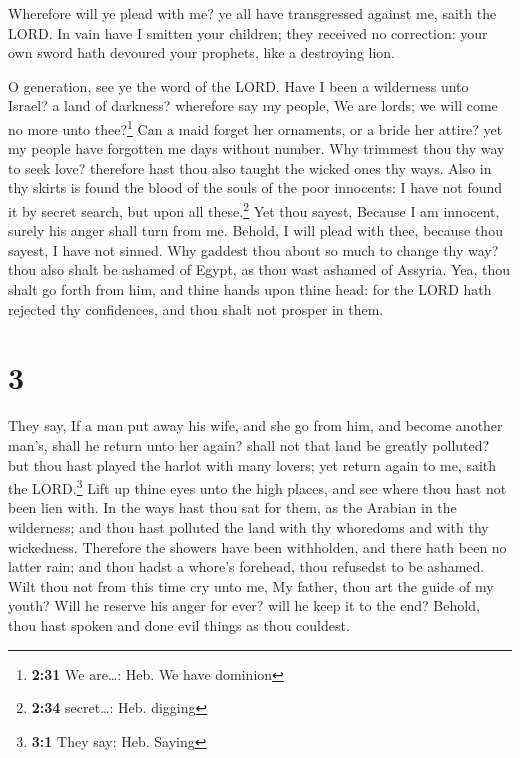  Wherefore will ye plead with me? ye all have
transgressed against me, saith the LORD.  In vain have I
smitten your children; they received no correction: your own sword hath
devoured your prophets, like a destroying lion.

 O generation, see ye the word of the LORD. Have I been a
wilderness unto Israel? a land of darkness? wherefore say my people, We
are lords; we will come no more unto thee?\footnote{\textbf{2:31} We
  are\ldots: Heb. We have dominion}  Can a maid forget
her ornaments, or a bride her attire? yet my people have forgotten me
days without number.  Why trimmest thou thy way to seek
love? therefore hast thou also taught the wicked ones thy ways.
 Also in thy skirts is found the blood of the souls of
the poor innocents: I have not found it by secret search, but upon all
these.\footnote{\textbf{2:34} secret\ldots: Heb. digging}
 Yet thou sayest, Because I am innocent, surely his anger
shall turn from me. Behold, I will plead with thee, because thou sayest,
I have not sinned.  Why gaddest thou about so much to
change thy way? thou also shalt be ashamed of Egypt, as thou wast
ashamed of Assyria.  Yea, thou shalt go forth from him,
and thine hands upon thine head: for the LORD hath rejected thy
confidences, and thou shalt not prosper in them.

\hypertarget{section-2}{%
\section{3}\label{section-2}}

 They say, If a man put away his wife, and she go from
him, and become another man's, shall he return unto her again? shall not
that land be greatly polluted? but thou hast played the harlot with many
lovers; yet return again to me, saith the LORD.\footnote{\textbf{3:1}
  They say: Heb. Saying}  Lift up thine eyes unto the high
places, and see where thou hast not been lien with. In the ways hast
thou sat for them, as the Arabian in the wilderness; and thou hast
polluted the land with thy whoredoms and with thy wickedness.
 Therefore the showers have been withholden, and there
hath been no latter rain; and thou hadst a whore's forehead, thou
refusedst to be ashamed.  Wilt thou not from this time cry
unto me, My father, thou art the guide of my youth?  Will
he reserve his anger for ever? will he keep it to the end? Behold, thou
hast spoken and done evil things as thou couldest.

